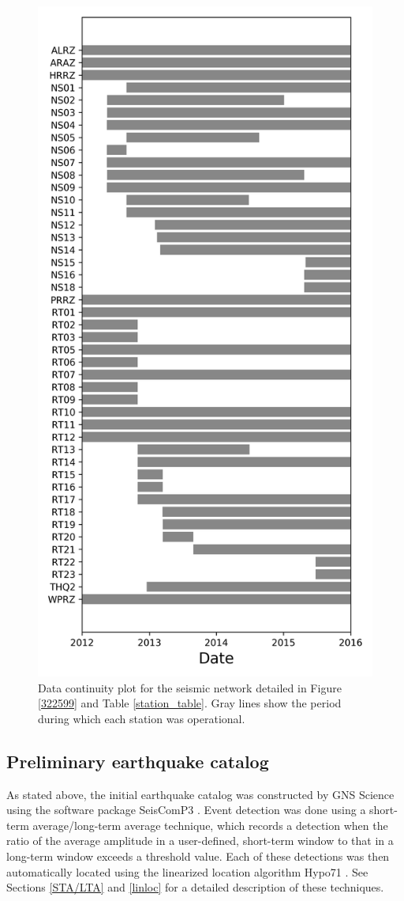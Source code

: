 \begin{figure}[h!]
\begin{center}
\includegraphics[width=0.70\columnwidth]{Chapter_2_Data/figures/data_continuity/Mercury_data_continuity_3-13}
\caption[Data continuity]{{
Data continuity plot for the seismic network detailed in Figure \ref{322599} and Table \ref{station_table}. Gray lines show the period during which each station was operational.
{\label{continuity}}%
}}
\end{center}
\end{figure}

\subsection{Preliminary earthquake catalog}\label{GNS_cat}
As stated above, the initial earthquake catalog was constructed by GNS Science using the software package SeisComP3 \citep{Weber2007}. Event detection was done using a short-term average\slash{long-term average} technique, which records a detection when the ratio of the average amplitude in a user-defined, short-term window to that in a long-term window exceeds a threshold value. Each of these detections was then automatically located using the linearized location algorithm Hypo71 \citep{Lee_1972}. See Sections \ref{STA/LTA} and \ref{linloc} for a detailed description of these techniques.

